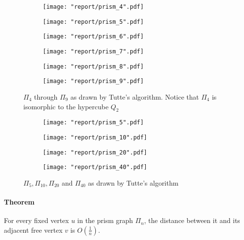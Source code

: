 \documentclass[11pt]{article}
\begin{document}
\begin{figure}[H]
    \begin{subfigure}{.3\textwidth}
        \texttt{[image: "report/prism\_4".pdf]}
    \end{subfigure}
    \begin{subfigure}{.3\textwidth}
        \texttt{[image: "report/prism\_5".pdf]}
    \end{subfigure}
    \begin{subfigure}{.3\textwidth}
        \texttt{[image: "report/prism\_6".pdf]}
    \end{subfigure}
    \begin{subfigure}{.3\textwidth}
        \texttt{[image: "report/prism\_7".pdf]}
    \end{subfigure}
    \begin{subfigure}{.3\textwidth}
        \texttt{[image: "report/prism\_8".pdf]}
    \end{subfigure}
    \begin{subfigure}{.3\textwidth}
        \texttt{[image: "report/prism\_9".pdf]}
    \end{subfigure}
\caption{$\Pi_4$ through $\Pi_{9}$ as drawn by Tutte's algorithm. Notice that $\Pi_4$ is isomorphic to the hypercube $Q_2$}
\end{figure}

\begin{figure}[H]
    \begin{subfigure}{.5\textwidth}
        \texttt{[image: "report/prism\_5".pdf]}
    \end{subfigure}
    \begin{subfigure}{.5\textwidth}
        \texttt{[image: "report/prism\_10".pdf]}
    \end{subfigure}
    \begin{subfigure}{.5\textwidth}
        \texttt{[image: "report/prism\_20".pdf]}
    \end{subfigure}
    \begin{subfigure}{.5\textwidth}
        \texttt{[image: "report/prism\_40".pdf]}
    \end{subfigure}
    \caption{$\Pi_5, \Pi_{10}, \Pi_{20}$ and $\Pi_{40}$ as drawn by Tutte's algorithm}
\end{figure}

\paragraph{Theorem} For every fixed vertex $u$ in the prism graph $\Pi_{n}$, the distance between it and its adjacent free vertex $v$ is $O(\frac{1}{n})$.
\end{document}
